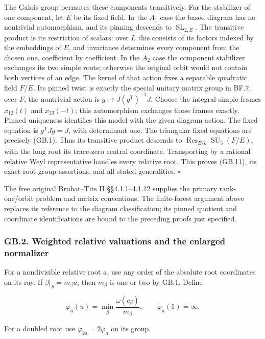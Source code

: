 \documentclass[
  11pt,
]{article}
\begin{document}
The Galois group permutes these components transitively. For the
stabilizer of one component, let \(E\) be its fixed field. In the
\(A_1\) case the based diagram has no nontrivial automorphism, and its
pinning descends to \(\operatorname{SL}_{2,E}\). The transitive product
is its restriction of scalars: over \(L\) this consists of its factors
indexed by the embeddings of \(E\), and invariance determines every
component from the chosen one, coefficient by coefficient. In the
\(A_2\) case the component stabilizer exchanges its two simple roots;
otherwise the original orbit would not contain both vertices of an edge.
The kernel of that action fixes a separable quadratic field \(F/E\). Its
pinned twist is exactly the special unitary matrix group in BF.7: over
\(F\), the nontrivial action is \(g\mapsto J(g^{\mathsf T})^{-1}J\).
Choose the integral simple frames \(x_{12}(t)\) and \(x_{23}(-t)\); this
automorphism exchanges those frames exactly. Pinned uniqueness
identifies this model with the given diagram action. The fixed equation
is \(g^{\mathsf T}J\bar g=J\), with determinant one. The triangular
fixed equations are precisely (GB.1). Thus its transitive product
descends to \(\operatorname{Res}_{E/k}\operatorname{SU}_3(F/E)\), with
the long root its trace-zero central coordinate. Transporting by a
rational relative Weyl representative handles every relative root. This
proves (GB.11), its exact root-group assertions, and all stated
generalities. \(\square\)

The free original Bruhat--Tits II §§4.1.1--4.1.12 supplies the primary
rank-one/orbit problem and matrix conventions. The finite-forest
argument above replaces its reference to the diagram classification; its
pinned quotient and coordinate identifications are bound to the
preceding proofs just specified.

\subsubsection{GB.2. Weighted relative valuations and the enlarged
normalizer}\label{gb.2.-weighted-relative-valuations-and-the-enlarged-normalizer}

For a nondivisible relative root \(a\), use any order of the absolute
root coordinates on its ray. If \(\beta|_S=m_\beta a\), then \(m_\beta\)
is one or two by GB.1. Define

\[
 \varphi_a(u)=\min_\beta\frac{\omega(c_\beta)}{m_\beta},\qquad
 \varphi_a(1)=\infty.
 \tag{GB.13}
\]

For a doubled root use \(\varphi_{2a}=2\varphi_a\) on its group.
\end{document}
